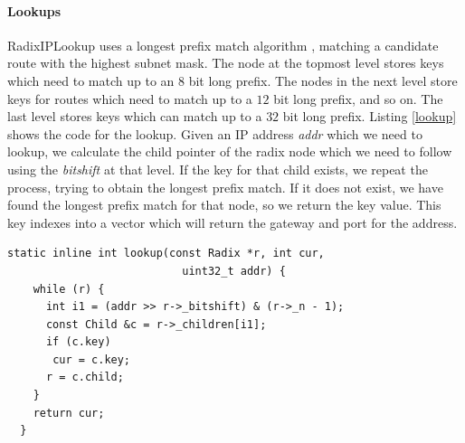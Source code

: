 \documentclass[a4paper]{article}
\begin{document}
\paragraph{Lookups}
RadixIPLookup uses a longest prefix match algorithm \cite{rfc2461}, matching a candidate route with the highest subnet mask. The node at the topmost level stores keys which need to match up to an 8 bit long prefix. The nodes in the next level store keys for routes which need to match up to a $12$ bit long prefix, and so on. The last level stores keys which can match up to a $32$ bit long prefix. Listing \ref{lookup} shows the code for the lookup. Given an IP address \emph{addr} which we need to lookup, we calculate the child pointer of the radix node which we need to follow using the \emph{bitshift} at that level. If the key for that child exists, we repeat the process, trying to obtain the longest prefix match. If it does not exist, we have found the longest prefix match for that node, so we return the key value. This key indexes into a vector which will return the gateway and port for the address.
\begin{lstlisting}[caption = The lookup function, label=lookup]
  static inline int lookup(const Radix *r, int cur, 
                           uint32_t addr) {
    while (r) {
      int i1 = (addr >> r->_bitshift) & (r->_n - 1);
      const Child &c = r->_children[i1];
      if (c.key)
       cur = c.key;
      r = c.child;
    }
    return cur;
  }
\end{lstlisting}
\end{document}
